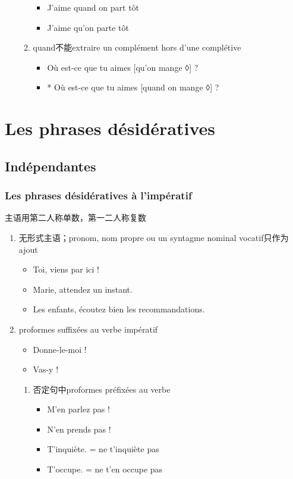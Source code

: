 \documentclass[UTF8]{report}
\begin{document}
\begin{enumerate}
\begin{enumerate}
        \begin{itemize}
            \item J’aime quand on part tôt
            \item J’aime qu’on parte tôt
        \end{itemize}
        \item quand不能extraire un complément hors d’une complétive
        \begin{itemize}
            \item Où est-ce que tu aimes [qu’on mange ◊] ?
            \item * Où est-ce que tu aimes [quand on mange ◊] ?
        \end{itemize}
    \end{enumerate}
\end{enumerate}


\section{Les phrases désidératives}
\subsection{Indépendantes}
\subsubsection{Les phrases désidératives à l’impératif}
主语用第二人称单数，第一二人称复数
\begin{enumerate}
    \item 无形式主语；pronom, nom propre ou un syntagme nominal vocatif只作为ajout
    \begin{itemize}
        \item Toi, viens par ici !
        \item Marie, attendez un instant.
        \item Les enfants, écoutez bien les recommandations.
    \end{itemize}
    \item proformes suffixées au verbe impératif
    \begin{itemize}
        \item Donne-le-moi !
        \item Vas-y !
    \end{itemize}
    \begin{enumerate}
        \item 否定句中proformes préfixées au verbe 
        \begin{itemize}
            \item M’en parlez pas !
            \item N’en prends pas !
            \item T’inquiète. = ne t’inquiète pas
            \item T’occupe. = ne t’en occupe pas
        \end{itemize}
    \end{enumerate}
\end{enumerate}
\end{document}
